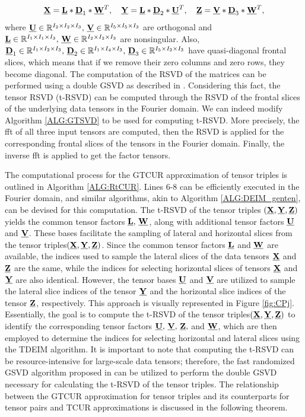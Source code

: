 \documentclass[preprint,12pt]{elsarticle}
\theoremstyle{definition}
\newcommand{\cX}{\underline{\bf X}}
\newcommand{\cY}{\underline{\bf Y}}
\newcommand{\cU}{\underline{\bf U}}
\newcommand{\cV}{\underline{\bf V}}
\newcommand{\cZ}{\underline{\bf Z}}
\newcommand{\cW}{\underline{\bf W}}
\newcommand{\cD}{\underline{\bf D}}
\newcommand{\cL}{\underline{\bf L}}
\begin{document}
\begin{equation}\label{rsvd}
\cX=\cL*\cD_1*\cW^T,\quad \cY=\cL*\cD_2*\cU^T,\quad \cZ=\cV*\cD_3*\cW^T,
\end{equation}
where $\cU\in\mathbb{R}^{I_2\times I_2\times I_3},\,\cV\in\mathbb{R}^{I_5\times I_5\times I_3}$ are orthogonal and $\cL\in\mathbb{R}^{I_1\times I_1\times I_3},\,\cW\in\mathbb{R}^{I_2\times I_2\times I_3}$ are nonsingular. Also, $\cD_1\in\mathbb{R}^{I_1\times I_2\times I_3},\,\cD_2\in\mathbb{R}^{I_1\times I_4\times I_3},\,\cD_3\in\mathbb{R}^{I_5\times I_2\times I_3}$ have quasi-diagonal frontal slices, which means that if we remove their zero columns and zero rows, they become diagonal. The computation of the RSVD of the matrices can be performed using a double GSVD as described in \cite{zha1991restricted,de1991restricted}. Considering this fact, the tensor RSVD (t-RSVD) can be computed through the RSVD of the frontal slices of the underlying data tensors in the Fourier domain. We can indeed modify Algorithm \ref{ALG:GTSVD} to be used for computing t-RSVD. More precisely, the fft of all three input tensors are computed, then the RSVD is applied for the corresponding frontal slices of the tensors in the Fourier domain. Finally, the inverse fft is applied to get the factor tensors.

The computational process for the GTCUR approximation of tensor triples is outlined in Algorithm \ref{ALG:RtCUR}. Lines 6-8 can be efficiently executed in the Fourier domain, and similar algorithms, akin to Algorithm  \ref{ALG:DEIM_genten}, can be devised for this computation. The t-RSVD of the tensor triples $(\cX,\cY,\cZ)$ yields the common tensor factors $\cL,\,\cW$, along with additional tensor factors $\cU$ and $\cV$. These bases facilitate the sampling of lateral and horizontal slices from the tensor triples$(\cX,\cY,\cZ)$. Since the common tensor factors $\cL$ and $\cW$ are available, the indices used to sample the lateral slices of the data tensors $\cX$ and $\cZ$ are the same, while the indices for selecting horizontal slices of tensors $\cX$ and $\cY$ are also identical. However, the tensor bases $\cU$ and $\cV$ are utilized to sample the lateral slice indices of the tensor $\cY$ and the horizontal slice indices of the tensor $\cZ$, respectively. This approach is visually represented in Figure \ref{fig:CPj}. Essentially, the goal is to compute the t-RSVD of the tensor triples$(\cX,\cY,\cZ)$ to identify the corresponding tensor factors $\cU,\,\cV,\,\cZ,$ and $\cW$, which are then employed to determine the indices for selecting horizontal and lateral slices using the TDEIM algorithm. It is important to note that computing the t-RSVD can be resource-intensive for large-scale data tensors; therefore, the fast randomized GSVD algorithm proposed in \cite{ahmadi2025randomized} can be utilized to perform the double GSVD necessary for calculating the t-RSVD of the tensor triples. The relationship between the GTCUR approximation for tensor triples and its counterparts for tensor pairs and TCUR approximations is discussed in the following theorem.
\end{document}
